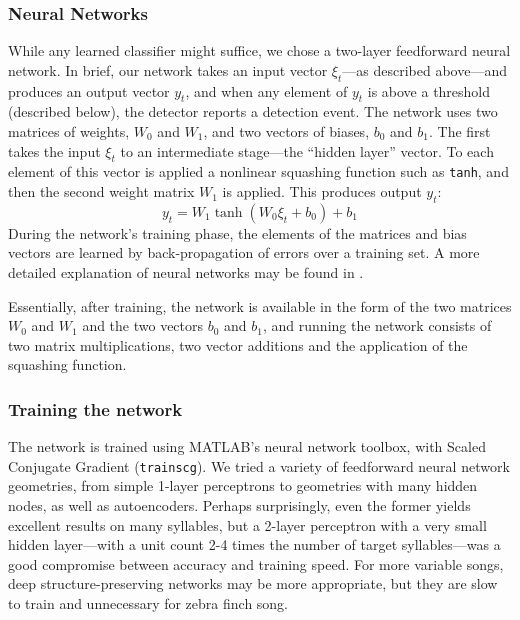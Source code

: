 \documentclass[10pt,letterpaper]{article}
\begin{document}
\subsubsection{Neural Networks}

While any learned classifier might suffice, we chose a two-layer
feedforward neural network.  In brief, our network takes an input
vector $\xi_t$---as described above---and produces an output vector
$y_t$, and when any element of $y_t$ is above a threshold (described
below), the detector reports a detection event.  The network uses two
matrices of weights, $W_0$ and $W_1$, and two vectors of biases, $b_0$
and $b_1$.  The first takes the input $\xi_t$ to an intermediate
stage---the ``hidden layer'' vector.  To each element of this vector
is applied a nonlinear squashing function such as {\tt tanh}, and then
the second weight matrix $W_1$ is applied.  This produces output
$y_t$:
\begin{equation*}
  y_t = W_1 \tanh (W_0 \xi_t + b_0) + b_1
\end{equation*}
During the network's training phase, the elements of the matrices and
bias vectors are learned by back-propagation of errors over a training
set.  A more detailed explanation of neural networks may be found in
\cite{hkp}.

Essentially, after training, the network is available in the form of
the two matrices $W_0$ and $W_1$ and the two vectors $b_0$ and $b_1$,
and running the network consists of two matrix multiplications, two
vector additions and the application of the squashing function.

\subsubsection{Training the network}

The network is trained using MATLAB's neural network toolbox, with
Scaled Conjugate Gradient ({\tt trainscg}). We tried a variety of
feedforward neural network geometries, from simple 1-layer perceptrons
to geometries with many hidden nodes, as well as autoencoders. Perhaps
surprisingly, even the former yields excellent results on many
syllables, but a 2-layer perceptron with a very small hidden
layer---with a unit count 2-4 times the number of target
syllables---was a good compromise between accuracy and training
speed. For more variable songs, deep structure-preserving networks may
be more appropriate, but they are slow to train and unnecessary for
zebra finch song.
\end{document}
